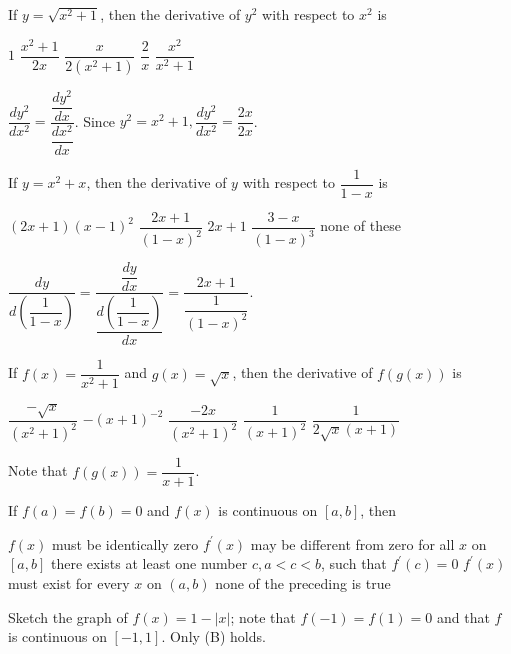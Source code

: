 \question
If $y=\sqrt{x^{2}+1}$, then the derivative of $y^{2}$ with respect to $x^{2}$ is
\begin{choices}
  \CorrectChoice $1$
  \choice $\dfrac{x^{2}+1}{2 x}$
  \choice $\dfrac{x}{2\left(x^{2}+1\right)}$
  \choice $\dfrac{2}{x}$
  \choice $\dfrac{x^{2}}{x^{2}+1}$
\end{choices}
\begin{solution}
$\dfrac{d y^{2}}{d x^{2}}=\dfrac{\dfrac{d y^{2}}{d x}}{\dfrac{d x^{2}}{d x}}$. Since $y^{2}=x^{2}+1, \dfrac{d y^{2}}{d x^{2}}=\dfrac{2 x}{2 x}$.
\end{solution}


\question
If $y=x^{2}+x$, then the derivative of $y$ with respect to $\dfrac{1}{1-x}$ is
\begin{choices}
  \CorrectChoice $(2 x+1)(x-1)^{2}$
  \choice $\dfrac{2 x+1}{(1-x)^{2}}$
  \choice $2 x+1$
  \choice $\dfrac{3-x}{(1-x)^{3}}$
  \choice none of these
\end{choices}
\begin{solution}
$\dfrac{d y}{d\left(\dfrac{1}{1-x}\right)}=\dfrac{\dfrac{d y}{d x}}{\dfrac{d\left(\dfrac{1}{1-x}\right)}{d x}}=\dfrac{2 x+1}{\dfrac{1}{(1-x)^{2}}}$.
\end{solution}





\newpage



\question
If $f(x)=\dfrac{1}{x^{2}+1}$ and $g(x)=\sqrt{x}$, then the derivative of $f(g(x))$ is
\begin{choices}
  \choice $\dfrac{-\sqrt{x}}{\left(x^{2}+1\right)^{2}}$
  \CorrectChoice $-(x+1)^{-2}$
  \choice $\dfrac{-2 x}{\left(x^{2}+1\right)^{2}}$
  \choice $\dfrac{1}{(x+1)^{2}}$
  \choice $\dfrac{1}{2 \sqrt{x}(x+1)}$
\end{choices}
\begin{solution}
Note that $f(g(x))=\dfrac{1}{x+1}$.
\end{solution}

\question
If $f(a)=f(b)=0$ and $f(x)$ is continuous on $[a, b]$, then
\begin{choices}
  \choice $f(x)$ must be identically zero
  \CorrectChoice $f^{\prime}(x)$ may be different from zero for all $x$ on $[a, b]$
  \choice there exists at least one number $c, a<c<b$, such that $f^{\prime}(c)=0$
  \choice $f^{\prime}(x)$ must exist for every $x$ on $(a, b)$
  \choice none of the preceding is true
\end{choices}
\begin{solution}
Sketch the graph of $f(x)=1-|x|$; note that $f(-1)=f(1)=0$ and that $f$ is continuous on $[-1,1]$. Only (B) holds.
\end{solution}

